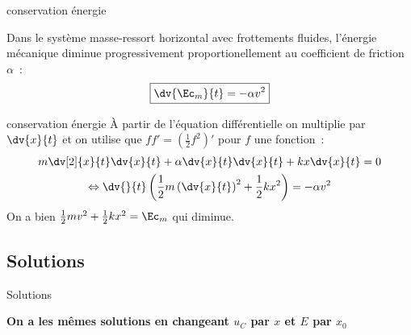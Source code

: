 \documentclass[../main/main.tex]{subfiles}
\begin{document}
\begin{tcbraster}[raster columns=2, raster equal height=rows]
    \begin{prop}[label=prop:emecacons]{conservation énergie}

        Dans le système masse-ressort horizontal avec frottements fluides,
        l'énergie mécanique diminue progressivement proportionellement au
        coefficient de friction $\alpha$~:
        \begin{equation*}
            \boxed{\dv{\Ec_{m}}{t} = -\alpha v^2}
        \end{equation*}

    \end{prop}
    \begin{demo}[label=demo:emecacons]{conservation énergie}
        À partir de l'équation différentielle on multiplie par $\dv{x}{t}$ et on
        utilise que $ff' = (\frac{1}{2}f^2)'$ pour $f$ une fonction~:
        \begin{gather*}
            m \dv[2]{x}{t} \dv{x}{t} + \alpha \dv{x}{t} \dv{x}{t} + kx \dv{x}{t} = 0\\
            \Leftrightarrow \dv{}{t} \left( \frac{1}{2}m \left( \dv{x}{t} \right)^2 +
            \frac{1}{2}kx^2 \right) = - \alpha v^2
        \end{gather*}
        On a bien $ \frac{1}{2}mv^2 + \frac{1}{2}kx^2 = \Ec_m$ qui diminue.
    \end{demo}
\end{tcbraster}

\subsection{Solutions}
\begin{center}
    \begin{prop}[width=.8\linewidth, label=prop:ressortsolu]{Solutions}
        \begin{center}
            \textbf{On a les mêmes solutions en changeant $u_C$ par $x$ et $E$
            par $x_0$}
        \end{center}
    \end{prop}
\end{center}
\end{document}
